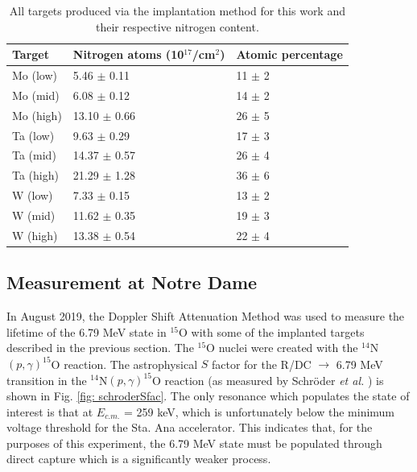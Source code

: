 \begin{table}[]
\centering
\begin{tabular}{@{}lll@{}}
\toprule
Target    & Nitrogen atoms (10$^{17}$/cm$^{2}$) & Atomic percentage \\ \midrule
Mo (low)  & 5.46 $\pm$ 0.11                     & 11 $\pm$ 2        \\
Mo (mid)  & 6.08 $\pm$ 0.12                     & 14 $\pm$ 2        \\
Mo (high) & 13.10 $\pm$ 0.66                    & 26 $\pm$ 5        \\
Ta (low)  & 9.63 $\pm$ 0.29                     & 17 $\pm$ 3        \\
Ta (mid)  & 14.37 $\pm$ 0.57                    & 26 $\pm$ 4        \\
Ta (high) & 21.29 $\pm$ 1.28                    & 36 $\pm$ 6        \\
W (low)   & 7.33 $\pm$ 0.15                     & 13 $\pm$ 2        \\
W (mid)   & 11.62 $\pm$ 0.35                    & 19 $\pm$ 3        \\
W (high)  & 13.38 $\pm$ 0.54                    & 22 $\pm$ 4        \\ \bottomrule
\end{tabular}
\caption{All targets produced via the implantation method for this work and their respective nitrogen content. }
\label{table: implantedTargets}
\end{table}



\subsection{Measurement at Notre Dame}
\label{sec: lifetimeND}

In August 2019, the Doppler Shift Attenuation Method was used to measure the lifetime of the 6.79 MeV state in $^{15}$O with some of the implanted targets described in the previous section. The $^{15}$O nuclei were created with the  $^{14}$N$\left( p,\gamma \right) ^{15}$O reaction. The astrophysical $S$ factor for the R/DC $\rightarrow$ 6.79 MeV transition in the $^{14}$N$\left( p,\gamma \right) ^{15}$O reaction (as measured by Schr{\"o}der \textit{et al.} \cite{Schroder1987}) is shown in Fig. \ref{fig: schroderSfac}. The only resonance which populates the state of interest is that at  $E_{c.m.}$ = 259 keV, which is unfortunately below the minimum voltage threshold for the Sta. Ana accelerator. This indicates that, for the purposes of this experiment, the 6.79 MeV state must be populated through direct capture which is a significantly weaker process. 


